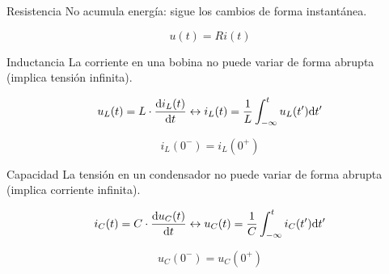 \documentclass[aspectratio=169, usenames,svgnames,dvipsnames]{beamer}
\begin{document}
\begin{frame}[label={sec:org207cc71}]{Resistencia}
No acumula energía: sigue los cambios de forma instantánea.

\[
u(t) = R i(t)
\]
\end{frame}



\begin{frame}[label={sec:org12f5967}]{Inductancia}
La corriente en una bobina no puede variar de forma abrupta (implica tensión infinita).

\[
u_L(t) = L \cdot \diff{i_L(t)}{t}
\leftrightarrow
i_L(t) = \frac{1}{L} \int^t_{-\infty}u_L(t') \mathrm{d}t'
\]

\[
\boxed{i_L(0^-) = i_L(0^+)}
\]
\end{frame}

\begin{frame}[label={sec:orgbbadfcb}]{Capacidad}
La tensión en un condensador no puede variar de forma abrupta (implica corriente infinita).

\[
i_C(t) = C \cdot \diff{u_C(t)}{t}
\leftrightarrow
u_C(t) = \frac{1}{C} \int^t_{-\infty}i_C(t') \mathrm{d}t'
\]

\[
\boxed{u_C(0^-) = u_C(0^+)}
\]
\end{frame}
\end{document}
